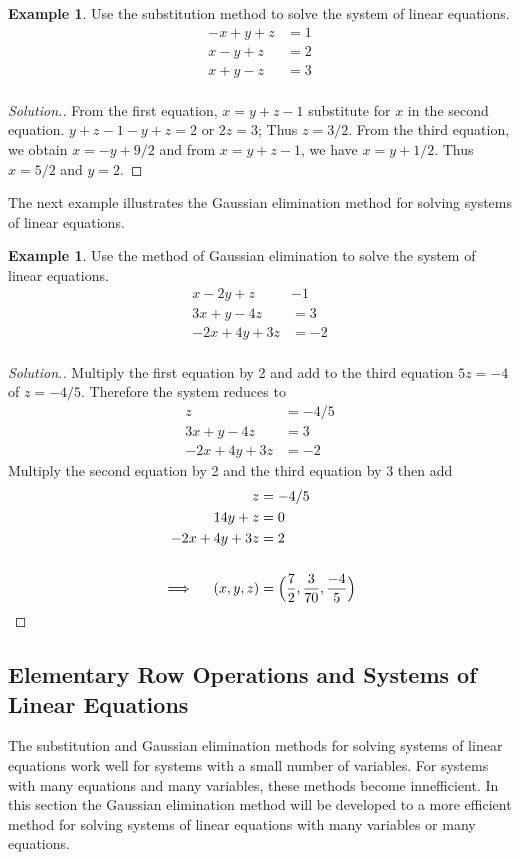 \documentclass[11pt,a4paper]{article}
\theoremstyle{definition}
\newtheorem{exa}[thm]{Example}
\newenvironment{solution}
  {\renewcommand{\qedsymbol}{}\begin{proof}[\textit{Solution}.]}
  {\end{proof}}
\begin{document}
\begin{exa}
Use the substitution method to solve the system of linear equations.
\begin{align*}
-x+y+z &=1\\x-y+z &=2\\x+y-z &=3\\
\end{align*}
\end{exa}


\begin{solution}
From the first equation, $x=y+z-1$ substitute for $x$ in the second equation. $y+z-1-y+z=2$ or $2z=3$; Thus $z=3/2$. From the third equation, we obtain $x=-y+9/2$ and from $x=y+z-1$, we have $x=y+1/2$. Thus $x=5/2$ and $y=2$.


\end{solution}
The next example illustrates the Gaussian elimination method for solving systems of linear equations.

\begin{exa}
Use the method of Gaussian elimination to solve the system of linear equations.
\begin{align*}
x-2y+z &-1\\3x+y-4z&=3\\-2x+4y+3z&=-2\\
\end{align*}
\end{exa}


\begin{solution}
Multiply the first equation by 2 and add to the third equation $5z=-4$ of $z=-4/5$. Therefore the system reduces to
\begin{align*}
z&=-4/5\\
3x+y-4z&=3\\-2x+4y+3z &=-2
\end{align*}
Multiply the second equation by 2 and the third equation by 3 then add
\begin{align*}
z&=-4/5\\14y+z&=0\\ -2x+4y+3z&=2\\\\ \implies\hspace{0.4cm}(x,y,z)&=\Big(\frac{7}{2},\frac{3}{70},\frac{-4}{5}\Big)\\
\end{align*}
\end{solution}


\subsection{Elementary Row Operations and Systems of Linear Equations}
The substitution and Gaussian elimination methods for solving systems of linear equations work well for systems with a small number of variables. For systems with many equations and many variables, these methods become innefficient. In this section the Gaussian elimination method will be developed to a more efficient method for solving systems of linear equations with many variables or many equations.
\end{document}
